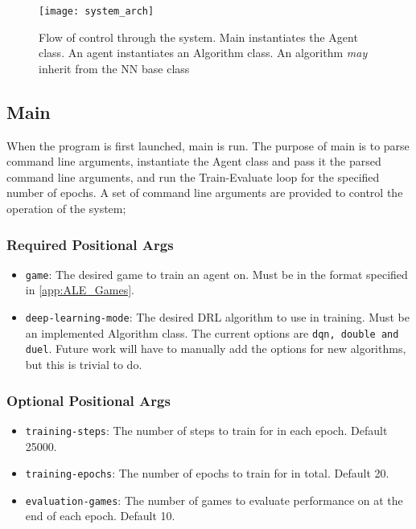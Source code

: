 \begin{figure}[H]
	\centering
	\texttt{[image: system\_arch]}
	\caption{Flow of control through the system. Main instantiates the Agent class. An agent instantiates an Algorithm class. An algorithm \textit{may} inherit from the NN base class}
	\label{fig:sys}
\end{figure}

\subsection{Main}
When the program is first launched, main is run. The purpose of main is to parse command line arguments, instantiate the Agent class and pass it the parsed command line arguments, and run the Train-Evaluate loop for the specified number of epochs. A set of command line arguments are provided to control the operation of the system;

\subsubsection{Required Positional Args}
\begin{itemize}
	\item \texttt{game}: The desired game to train an agent on. Must be in the format specified in \ref{app:ALE_Games}.
	\item \texttt{deep-learning-mode}: The desired DRL algorithm to use in training. Must be an implemented Algorithm class. The current options are \texttt{dqn, double and duel}. Future work will have to manually add the options for new algorithms, but this is trivial to do.
\end{itemize}

\subsubsection{Optional Positional Args}
\begin{itemize}
	\item \texttt{training-steps}: The number of steps to train for in each epoch. Default 25000.
	\item \texttt{training-epochs}: The number of epochs to train for in total. Default 20.
	\item \texttt{evaluation-games}: The number of games to evaluate performance on at the end of each epoch. Default 10.
\end{itemize}

